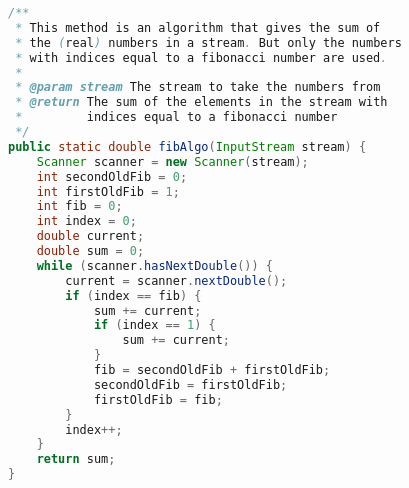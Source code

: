 \documentclass[12pt]{article}
\begin{document}
\begin{lstlisting}[language=java]
/**
 * This method is an algorithm that gives the sum of
 * the (real) numbers in a stream. But only the numbers
 * with indices equal to a fibonacci number are used.
 *
 * @param stream The stream to take the numbers from
 * @return The sum of the elements in the stream with
 *         indices equal to a fibonacci number
 */
public static double fibAlgo(InputStream stream) {
    Scanner scanner = new Scanner(stream);
    int secondOldFib = 0;
    int firstOldFib = 1;
    int fib = 0;
    int index = 0;
    double current;
    double sum = 0;
    while (scanner.hasNextDouble()) {
        current = scanner.nextDouble();
        if (index == fib) {
            sum += current;
            if (index == 1) {
                sum += current;
            }
            fib = secondOldFib + firstOldFib;
            secondOldFib = firstOldFib;
            firstOldFib = fib;
        }
        index++;
    }
    return sum;
}
\end{lstlisting}
\end{document}
